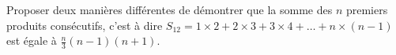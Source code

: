 %
%
	Proposer deux manières différentes de démontrer que la somme des $n$ premiers produits consécutifs, c'est à dire $S_{12} = 1\times2 + 2\times3 +3\times4 + \dots + n\times(n-1)$ est égale à $\frac{n}{3}(n-1)(n+1)$.
